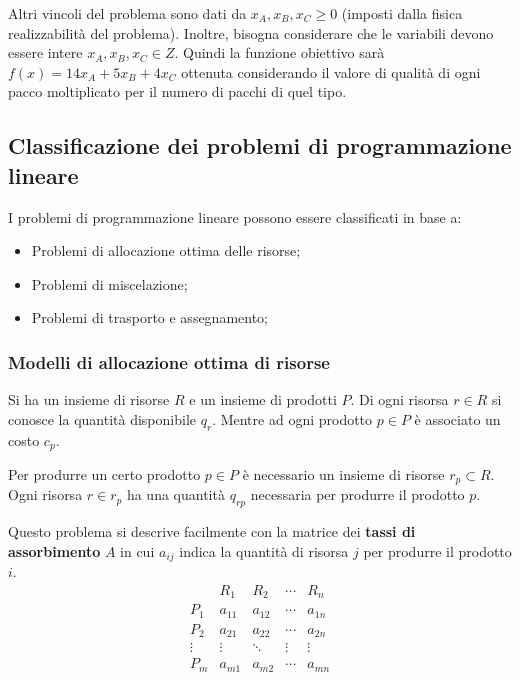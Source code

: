 \documentclass{article}
\begin{document}
Altri vincoli del problema sono dati da $x_A, x_B, x_C \geq 0$
(imposti dalla fisica realizzabilità del problema).
Inoltre, bisogna considerare che le variabili devono essere intere
$x_A, x_B, x_C \in Z$.
Quindi la funzione obiettivo sarà $f(x) = 14x_A + 5x_B + 4x_C$ ottenuta considerando 
il valore di qualità di ogni pacco moltiplicato per il numero di pacchi di quel tipo.

\subsection{Classificazione dei problemi di programmazione lineare}
I problemi di programmazione lineare possono essere classificati in base a:
\begin{itemize}
  \item Problemi di allocazione ottima delle risorse;
  \item Problemi di miscelazione;
  \item Problemi di trasporto e assegnamento;
\end{itemize}

\subsubsection{Modelli di allocazione ottima di risorse}
Si ha un insieme di risorse $R$ e un insieme di prodotti $P$. Di ogni risorsa
$r \in R$ si conosce la quantità disponibile $q_r$. Mentre ad ogni prodotto 
$p \in P$ è associato un costo $c_p$. 

Per produrre un certo prodotto $p \in P$ è necessario un insieme di risorse 
$r_p \subset R$. Ogni risorsa $r \in r_p$ ha una quantità $q_{rp}$ necessaria per 
produrre il prodotto $p$.

Questo problema si descrive facilmente con la matrice dei \textbf{tassi di assorbimento}
$A$ in cui $a_{ij}$ indica la quantità di risorsa $j$ per produrre il prodotto $i$.
\begin{equation*}
  \begin{matrix}
    & R_1 & R_2 & \cdots & R_n \\
    P_1 & a_{11} & a_{12} & \cdots & a_{1n} \\
    P_2 & a_{21} & a_{22} & \cdots & a_{2n} \\
    \vdots & \vdots & \ddots & \vdots & \vdots \\
    P_m &a_{m1} & a_{m2} & \cdots & a_{mn} \\
  \end{matrix}
\end{equation*}
\end{document}

